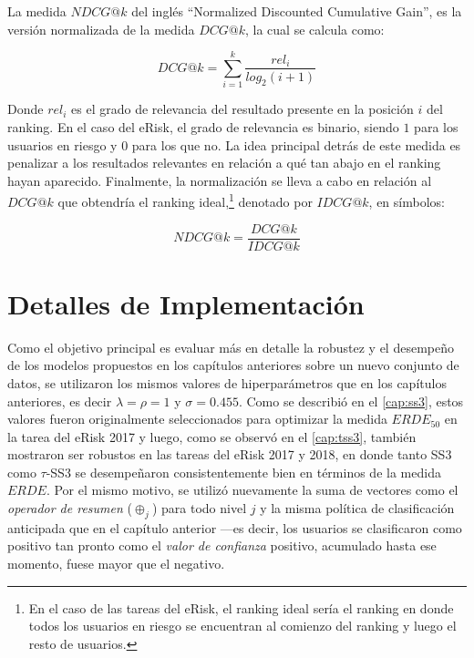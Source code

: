 La medida $NDCG@k$ del inglés ``Normalized Discounted Cumulative Gain'', es la versión normalizada de la medida $DCG@k$, la cual se calcula como:

$$DCG@k = \sum_{i=1}^k \frac{rel_i}{log_2\left(i+1\right)}$$

Donde $rel_{i}$ es el grado de relevancia del resultado presente en la posición $i$ del ranking. En el caso del eRisk, el grado de relevancia es binario, siendo $1$ para los usuarios en riesgo y $0$ para los que no. La idea principal detrás de este medida es penalizar a los resultados relevantes en relación a qué tan abajo en el ranking hayan aparecido.
Finalmente, la normalización se lleva a cabo en relación al $DCG@k$ que obtendría el ranking ideal,\footnote{En el caso de las tareas del eRisk, el ranking ideal sería el ranking en donde todos los usuarios en riesgo se encuentran al comienzo del ranking y luego el resto de usuarios.} denotado por $IDCG@k$, en símbolos:

\begin{equation}
NDCG@k = \frac{DCG@k}{IDCG@k}
\end{equation}


\section{Detalles de Implementación}
\label{sec:erisk2019implementacion}


Como el objetivo principal es evaluar más en detalle la robustez y el desempeño de los modelos propuestos en los capítulos anteriores sobre un nuevo conjunto de datos, se utilizaron los mismos valores de hiperparámetros que en los capítulos anteriores, es decir $\lambda=\rho=1$ y $\sigma= 0.455$. Como se describió en el \autoref{cap:ss3}, estos valores fueron originalmente seleccionados para optimizar la medida $ERDE_{50}$ en la tarea del eRisk 2017 y luego, como se observó en el \autoref{cap:tss3}, también mostraron ser robustos en las tareas del eRisk 2017 y 2018, en donde tanto SS3 como $\tau$-SS3 se desempeñaron consistentemente bien en términos de la medida $ERDE$.
Por el mismo motivo, se utilizó nuevamente la suma de vectores como el \emph{operador de resumen} ($\oplus_j$) para todo nivel $j$ y la misma política de clasificación anticipada que en el capítulo anterior ---es decir, los usuarios se clasificaron como positivo tan pronto como el \emph{valor de confianza} positivo, acumulado hasta ese momento, fuese mayor que el negativo.


